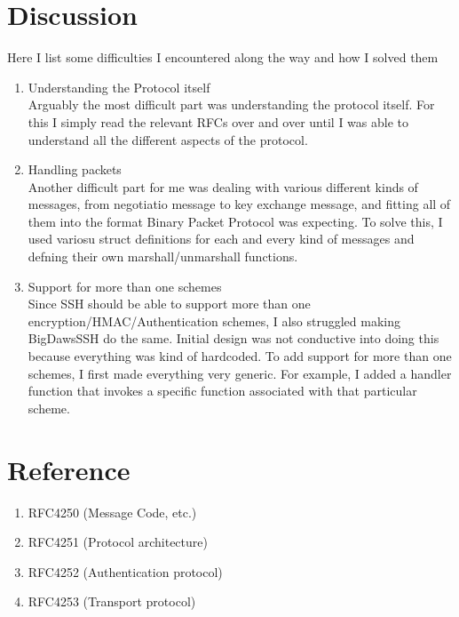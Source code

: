 \documentclass[10pt,sigconf]{acmart}
\begin{document}
\section{Discussion}
Here I list some difficulties I encountered along the way and how I solved them \begin{enumerate}
  \item Understanding the Protocol itself
  \\Arguably the most difficult part was understanding the protocol itself. For this I simply read the relevant RFCs over and over until I was able to understand all the different aspects of the protocol. 
  \item Handling packets 
  \\Another difficult part for me was dealing with various different kinds of messages, from negotiatio message to key exchange message, and fitting all of them into the format Binary Packet Protocol was expecting. To solve this, I used variosu struct definitions for each and every kind of messages and defning their own marshall/unmarshall functions.
  \item Support for more than one schemes
  \\Since SSH should be able to support more than one encryption/HMAC/Authentication schemes, I also struggled making BigDawsSSH do the same. Initial design was not conductive into doing this because everything was kind of hardcoded. To add support for more than one schemes, I first made everything very generic. For example, I added a handler function that invokes a specific function associated with that particular scheme.
\end{enumerate}
\section{Reference}
\begin{enumerate}
  \item RFC4250 (Message Code, etc.)
  \item RFC4251 (Protocol architecture)
  \item RFC4252 (Authentication protocol)
  \item RFC4253 (Transport protocol)
\end{enumerate}

% 
%  
\end{document}
